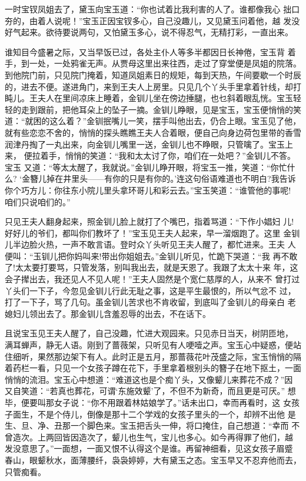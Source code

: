 一时宝钗凤姐去了，黛玉向宝玉道：“你也试着比我利害的人了。谁都像我心
拙口夯的，由着人说呢！”宝玉正因宝钗多心，自己没趣儿，又见黛玉问着他，越
发没好气起来。欲待要说两句，又怕黛玉多心，说不得忍气，无精打彩，一直出来。

谁知目今盛暑之际，又当早饭已过，各处主仆人等多半都因日长神倦，宝玉背
着手，到一处，一处鸦雀无声。从贾母这里出来往西，走过了穿堂便是凤姐的院落。
到他院门前，只见院门掩着，知道凤姐素日的规矩，每到天热，午间要歇一个时辰
的，进去不便。遂进角门，来到王夫人上房里。只见几个丫头手里拿着针线，却打
盹儿。王夫人在里间凉床上睡着，金钏儿坐在傍边捶腿，也乜斜着眼乱恍。宝玉轻
轻的走到跟前，把他耳朵上的坠子一摘。金钏儿睁眼，见是宝玉，宝玉便悄悄的笑
道：“就困的这么着？”金钏抿嘴儿一笑，摆手叫他出去，仍合上眼。宝玉见了他，
就有些恋恋不舍的，悄悄的探头瞧瞧王夫人合着眼，便自己向身边荷包里带的香雪
润津丹掏了一丸出来，向金钏儿嘴里一送，金钏儿也不睁眼，只管噙了。宝玉上来，
便拉着手，悄悄的笑道：“我和太太讨了你，咱们在一处吧？”金钏儿不答。宝玉
又道：“等太太醒了，我就说。”金钏儿睁开眼，将宝玉一推，笑道：“你忙什么?
‘金簪儿掉在井里头——有你的只是有你的。’连这句俗语难道也不明白?我告诉
你个巧方儿：你往东小院儿里头拿环哥儿和彩云去。”宝玉笑道：“谁管他的事呢!
咱们只说咱们的。”

只见王夫人翻身起来，照金钏儿脸上就打了个嘴巴，指着骂道：“下作小娼妇
儿!好好儿的爷们，都叫你们教坏了！”宝玉见王夫人起来，早一溜烟跑了。这里
金钏儿半边脸火热，一声不敢言语。登时众丫头听见王夫人醒了，都忙进来。王夫
人便叫：“玉钏儿把你妈叫来!带出你姐姐去。”金钏儿听见，忙跪下哭道：“我
再不敢了!太太要打要骂，只管发落，别叫我出去，就是天恩了。我跟了太太十来
年，这会子撵出去，我还见人不见人呢！”王夫人固然是个宽仁慈厚的人，从来不
曾打过丫头们一下子，今忽见金钏儿行此无耻之事，这是平生最恨的，所以气忿不
过，打了一下子，骂了几句。虽金钏儿苦求也不肯收留，到底叫了金钏儿的母亲白
老媳妇儿领出去了。那金钏儿含羞忍辱的出去，不在话下。

且说宝玉见王夫人醒了，自己没趣，忙进大观园来。只见赤日当天，树阴匝地，
满耳蝉声，静无人语。刚到了蔷薇架，只听见有人哽噎之声。宝玉心中疑惑，便站
住细听，果然那边架下有人。此时正是五月，那蔷薇花叶茂盛之际，宝玉悄悄的隔
着药栏一看，只见一个女孩子蹲在花下，手里拿着根别头的簪子在地下抠土，一面
悄悄的流泪。宝玉心中想道：“难道这也是个痴丫头，又像颦儿来葬花不成？”因
又自笑道：“若真也葬花，可谓‘东施效颦’了，不但不为新奇，而且更是可厌。”
想毕，便要叫那女子说：“你不用跟着林姑娘学了。”话未出口，幸而再看时，这
女孩子面生，不是个侍儿，倒像是那十二个学戏的女孩子里头的一个，却辨不出他
是生、旦、净、丑那一个脚色来。宝玉把舌头一伸，将口掩住，自己想道：“幸而
不曾造次。上两回皆因造次了，颦儿也生气，宝儿也多心。如今再得罪了他们，越
发没意思了。”一面想，一面又恨不认得这个是谁。再留神细看，见这女孩子眉蹙
春山，眼颦秋水，面薄腰纤，袅袅婷婷，大有黛玉之态。宝玉早又不忍弃他而去，
只管痴看。

